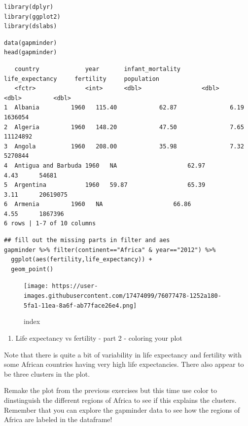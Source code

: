 \documentclass[
]{article}
\providecommand{\tightlist}{%
  \setlength{\itemsep}{0pt}\setlength{\parskip}{0pt}}
\begin{document}
\begin{verbatim}
library(dplyr)
library(ggplot2)
library(dslabs)
\end{verbatim}

\begin{verbatim}
data(gapminder)
head(gapminder)
\end{verbatim}

\begin{verbatim}
   country             year       infant_mortality      life_expectancy     fertility     population
   <fctr>              <int>      <dbl>                 <dbl>               <dbl>         <dbl>
1  Albania         1960   115.40            62.87               6.19      1636054   
2  Algeria         1960   148.20            47.50               7.65      11124892  
3  Angola          1960   208.00            35.98               7.32      5270844   
4  Antigua and Barbuda 1960   NA                    62.97               4.43      54681 
5  Argentina           1960   59.87                 65.39               3.11      20619075  
6  Armenia         1960   NA                    66.86               4.55      1867396   
6 rows | 1-7 of 10 columns
\end{verbatim}

\begin{verbatim}
## fill out the missing parts in filter and aes
gapminder %>% filter(continent=="Africa" & year=="2012") %>%
  ggplot(aes(fertility,life_expectancy)) +
  geom_point()
\end{verbatim}

\begin{figure}
\centering
\texttt{[image: https://user-images.githubusercontent.com/17474099/76077478-1252a180-5fa1-11ea-8a6f-ab77face26e4.png]}
\caption{index}
\end{figure}

\begin{enumerate}
\def\labelenumi{\arabic{enumi}.}
\setcounter{enumi}{1}
\tightlist
\item
  Life expectancy vs fertility - part 2 - coloring your plot
\end{enumerate}

Note that there is quite a bit of variability in life expectancy and
fertility with some African countries having very high life
expectancies. There also appear to be three clusters in the plot.

Remake the plot from the previous exercises but this time use color to
dinstinguish the different regions of Africa to see if this explains the
clusters. Remember that you can explore the gapminder data to see how
the regions of Africa are labeled in the dataframe!
\end{document}
